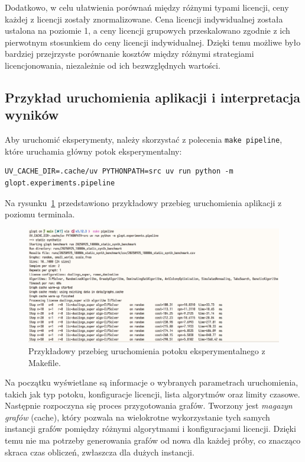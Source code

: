 Dodatkowo, w celu ułatwienia porównań między różnymi typami licencji, ceny każdej z licencji zostały znormalizowane. Cena licencji indywidualnej została ustalona na poziomie 1, a ceny licencji grupowych przeskalowano zgodnie z ich pierwotnym stosunkiem do ceny licencji indywidualnej. Dzięki temu możliwe było bardziej przejrzyste porównanie kosztów między różnymi strategiami licencjonowania, niezależnie od ich bezwzględnych wartości.

\subsection{Przykład uruchomienia aplikacji i interpretacja wyników}

Aby uruchomić eksperymenty, należy skorzystać z polecenia \texttt{make pipeline}, które uruchamia główny potok eksperymentalny:
\begin{verbatim}
UV_CACHE_DIR=.cache/uv PYTHONPATH=src uv run python -m glopt.experiments.pipeline
\end{verbatim}

Na rysunku~\ref{fig:cli-content} przedstawiono przykładowy przebieg uruchomienia aplikacji z poziomu terminala.

\begin{figure}[H]
  \centering
  \includegraphics[width=0.95\linewidth]{assets/cli-content.png}
  \caption{Przykładowy przebieg uruchomienia potoku eksperymentalnego z Makefile.}
  \label{fig:cli-content}
\end{figure}

Na początku wyświetlane są informacje o wybranych parametrach uruchomienia, takich jak typ potoku, konfiguracje licencji, lista algorytmów oraz limity czasowe. Następnie rozpoczyna się proces przygotowania grafów. Tworzony jest \textit{magazyn grafów} (cache), który pozwala na wielokrotne wykorzystanie tych samych instancji grafów pomiędzy różnymi algorytmami i konfiguracjami licencji. Dzięki temu nie ma potrzeby generowania grafów od nowa dla każdej próby, co znacząco skraca czas obliczeń, zwłaszcza dla dużych instancji.

